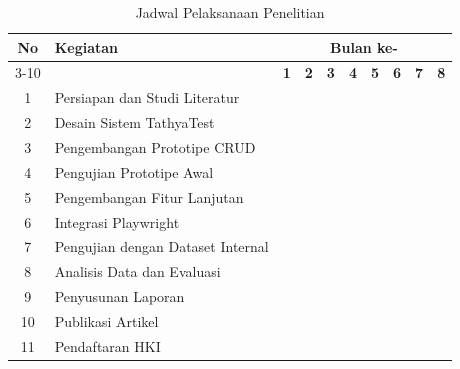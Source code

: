 \begin{table}[htbp]
\centering
\caption{Jadwal Pelaksanaan Penelitian}
\label{tab:jadwal-penelitian}
\begin{tabular}{|c|p{7cm}|c|c|c|c|c|c|c|c|}
\hline
\multirow{2}{*}{\textbf{No}} & \multirow{2}{*}{\textbf{Kegiatan}} & \multicolumn{8}{c|}{\textbf{Bulan ke-}} \\
\cline{3-10}
& & \textbf{1} & \textbf{2} & \textbf{3} & \textbf{4} & \textbf{5} & \textbf{6} & \textbf{7} & \textbf{8} \\
\hline
1 & Persiapan dan Studi Literatur & \cellcolor{blue!20} & \cellcolor{blue!20} & & & & & & \\
\hline
2 & Desain Sistem TathyaTest & \cellcolor{blue!20} & \cellcolor{blue!20} & & & & & & \\
\hline
3 & Pengembangan Prototipe CRUD & & \cellcolor{blue!20} & \cellcolor{blue!20} & & & & & \\
\hline
4 & Pengujian Prototipe Awal & & & \cellcolor{blue!20} & \cellcolor{blue!20} & & & & \\
\hline
5 & Pengembangan Fitur Lanjutan & & & & \cellcolor{blue!20} & \cellcolor{blue!20} & & & \\
\hline
6 & Integrasi Playwright & & & & & \cellcolor{blue!20} & \cellcolor{blue!20} & & \\
\hline
7 & Pengujian dengan Dataset Internal & & & & & & \cellcolor{blue!20} & \cellcolor{blue!20} & \\
\hline
8 & Analisis Data dan Evaluasi & & & & & & & \cellcolor{blue!20} & \cellcolor{blue!20} \\
\hline
9 & Penyusunan Laporan & & & & & & & \cellcolor{blue!20} & \cellcolor{blue!20} \\
\hline
10 & Publikasi Artikel & & & & & & & & \cellcolor{blue!20} \\
\hline
11 & Pendaftaran HKI & & & & & & & & \cellcolor{blue!20} \\
\hline
\end{tabular}
\end{table}
